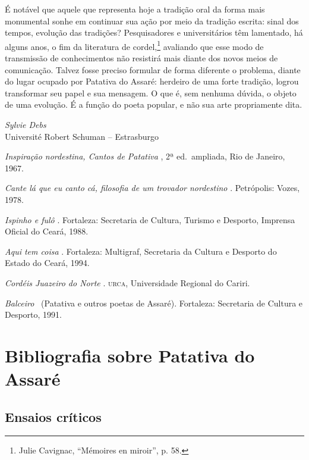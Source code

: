 É notável que aquele que representa hoje a tradição oral da forma mais
monumental sonhe em continuar sua ação por meio da tradição escrita: sinal dos
tempos, evolução das tradições? Pesquisadores e universitários têm lamentado, há
alguns anos, o fim da literatura de cordel,\footnote{ Julie Cavignac, “Mémoires
en miroir”, p. 58.} avaliando que esse modo de transmissão de conhecimentos não
resistirá mais diante dos novos meios de comunicação. Talvez fosse preciso
formular de forma diferente o problema, diante do lugar ocupado por Patativa do
Assaré: herdeiro de uma forte tradição, logrou transformar seu papel e sua
mensagem. O que é, sem nenhuma dúvida, o objeto de uma evolução. É a função do
poeta popular, e não sua arte propriamente dita.

\begin{flushright}
\textit{Sylvie Debs}\\
Université Robert Schuman -- Estrasburgo
\end{flushright}


\bigskip

\begin{bibliohedra}

\renewcommand{\tit}[1]{\item[\textit{#1}]}

\tit{Inspiração nordestina, Cantos de Patativa}, 2ª ed.~ampliada,
Rio de Janeiro, 1967.

\tit{Cante lá que eu canto cá, filosofia de um trovador 
nordestino}. Petrópolis: Vozes, 1978.

\tit{Ispinho e fulô}. Fortaleza: Secretaria de Cultura, Turismo
e Desporto, Imprensa Oficial do Ceará, 1988.

\tit{Aqui tem coisa}. Fortaleza: Multigraf, Secretaria 
da Cultura e Desporto do Estado do Ceará, 1994. 

\tit{Cordéis Juazeiro do Norte}. \textsc{urca}, Universidade Regional
do Cariri.

\tit{Balceiro}\ (Patativa e outros poetas de Assaré). Fortaleza: 
Secretaria de Cultura e Desporto, 1991.

\end{bibliohedra}

\bigskip

\section{Bibliografia sobre Patativa do Assaré}

\subsection{Ensaios críticos}

